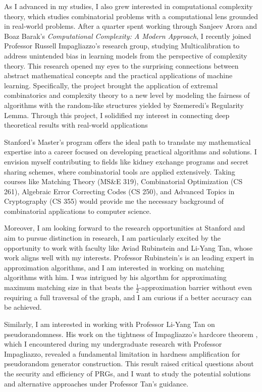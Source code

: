 \documentclass[12pt]{article}
\begin{document}
As I advanced in my studies, I also grew interested in computational complexity theory, which
studies combinatorial problems with a computational lens grounded in real-world problems. After a
quarter spent working through Sanjeev Arora and Boaz Barak's \textit{Computational Complexity: A
Modern Approach}\cite{arora2009computational}, I recently joined Professor Russell Impagliazzo's
research group, studying Multicalibration to address unintended bias in learning models from the
perspective of complexity theory. This research opened my eyes to the surprising connections between
abstract mathematical concepts and the practical applications of machine learning. Specifically, the
project brought the application of extremal combinatorics and complexity theory to a new level by
modeling the fairness of algorithms with the random-like structures yielded by Szemeredi's
Regularity Lemma. Through this project, I solidified my interest in connecting deep theoretical
results with real-world applications

Stanford's Master's program offers the ideal path to translate my mathematical expertise into a
career focused on developing practical algorithms and solutions. I envision myself contributing to
fields like kidney exchange programs and secret sharing schemes, where combinatorial tools are
applied extensively. Taking courses like Matching Theory (MS\&E 319), Combinatorial Optimization (CS
261), Algebraic Error Correcting Codes (CS 250), and Advanced Topics in Cryptography (CS 355) would
provide me the necessary background of combinatorial applications to computer science. 

Moreover, I am looking forward to the research opportunities at Stanford and aim to pursue
distinction in research, I am particularly excited by the opportunity to work with faculty like
Aviad Rubinstein and Li-Yang Tan, whose work aligns well with my interests. Professor Rubinstein's
is an leading expert in approximation algorithms, and I am interested in working on matching
algorithms with him. I was intrigued by his algorthm for approximating maximum matching size in
\cite{doi:10.1137/1.9781611977554.ch151} that beats the $\frac{1}{2}$-approximation barrier without
even requiring a full traversal of the graph, and I am curious if a better accuracy can be achieved.

Similarly, I am interested in working with Professor Li-Yang Tan on pseudorandomness. His work on
the tightness of Impagliazzo's hardcore theorem \cite{blanc2024samplecomplexitysmoothboosting},
which I encountered during my undergraduate research with Professor Impagliazzo, revealed a
fundamental limitation in hardness amplification for pseudorandom generator construction. This
result raised critical questions about the security and efficiency of PRGs, and I want to study the
potential solutions and alternative approaches under Professor Tan's guidance.
\end{document}
